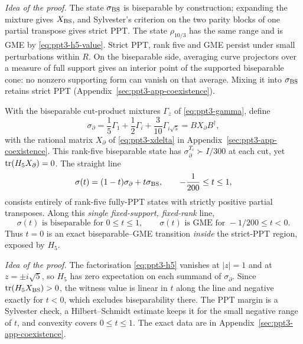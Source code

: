 \emph{Idea of the proof.} The state $\sigma_{\rm BS}$ is biseparable by construction; expanding the mixture gives
$X_{\rm BS}$, and Sylvester's criterion on the two parity blocks of one partial transpose gives strict PPT. The state
$\rho_{10/3}$ has the same range and is GME by \eqref{eq:ppt3-h5-value}. Strict PPT, rank five and GME persist under small
perturbations within $R$. On the biseparable side, averaging curve projectors over a measure of full support gives an
interior point of the supported biseparable cone: no nonzero supporting form can vanish on that average. Mixing it into
$\sigma_{\rm BS}$ retains strict PPT (Appendix~\ref{sec:ppt3-app-coexistence}).

\begin{proposition}
\label{prop:ppt3-exposed-transition}
With the biseparable cut-product mixtures $\Gamma_z$ of
\eqref{eq:ppt3-gamma}, define
\begin{equation}\label{eq:ppt3-exposed-state}
 \sigma_\partial=\frac15 \Gamma_1+\frac12 \Gamma_i+
                  \frac3{10}\Gamma_{i\sqrt5}
 =BX_\partial B^\dagger ,
\end{equation}
with the rational matrix $X_\partial$ of \eqref{eq:ppt3-xdelta} in Appendix~\ref{sec:ppt3-app-coexistence}.
This rank-five biseparable state has
$\sigma_\partial^{T_c}\succ I/300$ at each cut, yet
$\operatorname{tr}(H_5X_\partial)=0$. The straight line
\begin{equation}\label{eq:ppt3-exact-phase-line}
 \sigma(t)=(1-t)\sigma_\partial+t\sigma_{\rm BS},
          \qquad -\frac1{200}\le t\le1,
\end{equation}
consists entirely of rank-five fully-PPT states
with strictly positive partial transposes. Along
this \emph{single fixed-support, fixed-rank} line,
\[
 \sigma(t)\text{ is biseparable for }0\le t\le1,
 \qquad
 \sigma(t)\text{ is GME for }-1/200\le t<0.
\]
Thus $t=0$ is an exact biseparable--GME transition
\emph{inside} the strict-PPT region, exposed by $H_5$.
\end{proposition}

\emph{Idea of the proof.} The factorisation \eqref{eq:ppt3-h5} vanishes at $|z|=1$ and at $z=\pm i\sqrt5$, so $H_5$ has zero
expectation on each summand of $\sigma_\partial$. Since $\operatorname{tr}(H_5X_{\rm BS})>0$, the witness value is linear in $t$ along
the line and negative exactly for $t<0$, which excludes biseparability there. The PPT margin is a Sylvester check, a
Hilbert--Schmidt estimate keeps it for the small negative range of $t$, and convexity covers $0\le t\le1$. The exact data are
in Appendix~\ref{sec:ppt3-app-coexistence}.
